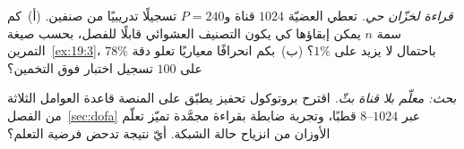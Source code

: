 \begin{exercise}[\lvlB]
\label{ex:21:6}
\emph{قراءة لخزّان حي.} تعطي العضيّة $1024$ قناة و$P=240$ تسجيلًا تدريبيًا من صنفين. (أ)~كم سمة $n$ يمكن إبقاؤها كي يكون التصنيف العشوائي قابلًا للفصل، بحسب صيغة التمرين~\ref{ex:19:3}، باحتمال لا يزيد على $1\%$؟ (ب)~بكم انحرافًا معياريًا تعلو دقة $78\%$ على $100$ تسجيل اختبار فوق التخمين؟
\end{exercise}

\begin{exercise}[\lvlC]
\label{ex:21:7}
\emph{بحث: معلّم بلا قناة بثّ.} اقترح بروتوكول تحفيز يطبّق على المنصة قاعدة العوامل الثلاثة من الفصل~\ref{sec:dofa} عبر $8\text{--}1024$ قطبًا، وتجربة ضابطة بقراءة مجمَّدة تميّز تعلّم الأوزان من انزياح حالة الشبكة. أيّ نتيجة تدحض فرضية التعلم؟
\end{exercise}
